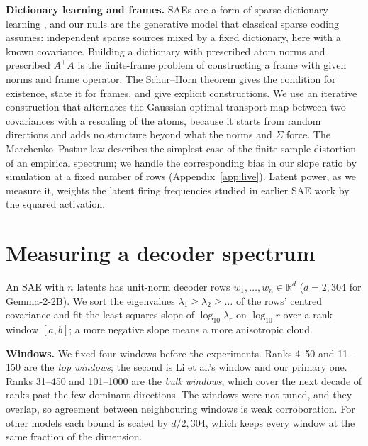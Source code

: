 \documentclass{article}
\newcommand{\Sig}{\Sigma}
\begin{document}
\textbf{Dictionary learning and frames.} SAEs are a form of sparse dictionary learning \citep{olshausen1996emergence,bricken2023monosemanticity}, and our nulls are the generative model that classical sparse coding assumes: independent sparse sources mixed by a fixed dictionary, here with a known covariance. Building a dictionary with prescribed atom norms and prescribed $A^\top A$ is the finite-frame problem of constructing a frame with given norms and frame operator. The Schur--Horn theorem \citep{horn1954doubly} gives the condition for existence, \citet{antezana2007schurhorn} state it for frames, and \citet{cahill2013constructing} give explicit constructions. We use an iterative construction that alternates the Gaussian optimal-transport map between two covariances \citep{olkin1982distance} with a rescaling of the atoms, because it starts from random directions and adds no structure beyond what the norms and $\Sig$ force. The Marchenko--Pastur law \citep{marchenko1967distribution} describes the simplest case of the finite-sample distortion of an empirical spectrum; we handle the corresponding bias in our slope ratio by simulation at a fixed number of rows (Appendix~\ref{app:live}). Latent power, as we measure it, weights the latent firing frequencies studied in earlier SAE work \citep{bricken2023monosemanticity} by the squared activation.

\section{Measuring a decoder spectrum}
\label{sec:setup}

An SAE with $n$ latents has unit-norm decoder rows $w_1,\dots,w_n \in \mathbb{R}^d$ ($d=2{,}304$ for Gemma-2-2B). We sort the eigenvalues $\lambda_1 \ge \lambda_2 \ge \dots$ of the rows' centred covariance and fit the least-squares slope of $\log_{10}\lambda_r$ on $\log_{10} r$ over a rank window $[a,b]$; a more negative slope means a more anisotropic cloud.

\textbf{Windows.} We fixed four windows before the experiments. Ranks 4--50 and 11--150 are the \emph{top windows}; the second is Li et al.'s window and our primary one. Ranks 31--450 and 101--1000 are the \emph{bulk windows}, which cover the next decade of ranks past the few dominant directions. The windows were not tuned, and they overlap, so agreement between neighbouring windows is weak corroboration. For other models each bound is scaled by $d/2{,}304$, which keeps every window at the same fraction of the dimension.
\end{document}
